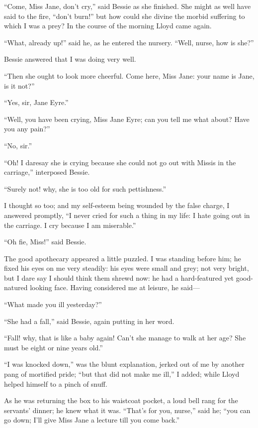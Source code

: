 \enquote{Come, Miss Jane, don't cry,} said Bessie as she finished.  She
might as well have said to the fire, \enquote{don't burn!} but how could
she divine the morbid suffering to which I was a prey?  In the course of
the morning \Mr{} Lloyd came again.

\enquote{What, already up!} said he, as he entered the nursery. 
\enquote{Well, nurse, how is she?}

Bessie answered that I was doing very well.

\enquote{Then she ought to look more cheerful.  Come here, Miss Jane:
your name is Jane, is it not?}

\enquote{Yes, sir, Jane Eyre.}

\enquote{Well, you have been crying, Miss Jane Eyre; can you tell me
what about?  Have you any pain?}

\enquote{No, sir.}

\enquote{Oh!  I daresay she is crying because she could not go out with
Missis in the carriage,} interposed Bessie.

\enquote{Surely not! why, she is too old for such pettishness.}

I thought so too; and my self-esteem being wounded by the false charge,
I answered promptly, \enquote{I never cried for such a thing in my life:
I hate going out in the carriage.  I cry because I am miserable.}

\enquote{Oh fie, Miss!} said Bessie.

The good apothecary appeared a little puzzled.  I was standing before
him; he fixed his eyes on me very steadily: his eyes were small and
grey; not very bright, but I dare say I should think them shrewd now: he
had a hard-featured yet good-natured looking face.  Having considered me
at leisure, he said---

\enquote{What made you ill yesterday?}

\enquote{She had a fall,} said Bessie, again putting in her word.

\enquote{Fall! why, that is like a baby again!  Can't she manage to walk
at her age?  She must be eight or nine years old.}

\enquote{I was knocked down,} was the blunt explanation, jerked out of
me by another pang of mortified pride; \enquote{but that did not make me
ill,} I added; while \Mr{} Lloyd helped himself to a pinch of snuff.

As he was returning the box to his waistcoat pocket, a loud bell rang
for the servants' dinner; he knew what it was.  \enquote{That's for you,
nurse,} said he; \enquote{you can go down; I'll give Miss Jane a lecture
till you come back.}

